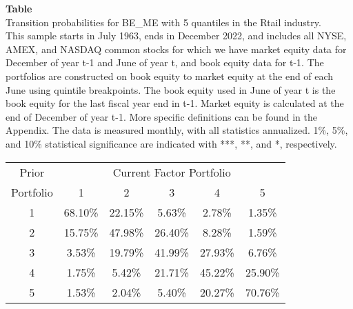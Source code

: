 \begin{table*}[ht!]
\raggedright
{}
\label{tab: transition_probs_BE_ME_Rtail_with_5_quantiles}
\textbf{Table \thetable} \\
Transition probabilities for BE_ME with 5 quantiles in the Rtail industry. \\
\hspace*{1em}This sample starts in July 1963, ends in December 2022, and includes all NYSE, AMEX, and NASDAQ common stocks for which we have market equity data for December of year t-1 and June of year t, and book equity data for t-1. The portfolios are constructed on book equity to market equity at the end of each June using quintile breakpoints.  The book equity used in June of year t is the book equity for the last fiscal year end in t-1.  Market equity is calculated at the end of December of year t-1.  More specific definitions can be found in the Appendix.  The data is measured monthly, with all statistics annualized.  1\%, 5\%, and 10\% statistical significance are indicated with ***, **, and *, respectively. \\
\vspace{0.5em}
\centering
\begin{adjustbox}{max width=\textwidth}
\begin{tabular}{@{}cccccc@{}}
\toprule
Prior & \multicolumn{5}{c}{Current Factor Portfolio} \\
Portfolio & 1 & 2 & 3 & 4 & 5 \\
\midrule
1 & 68.10\% & 22.15\% & 5.63\% & 2.78\% & 1.35\% \\
2 & 15.75\% & 47.98\% & 26.40\% & 8.28\% & 1.59\% \\
3 & 3.53\% & 19.79\% & 41.99\% & 27.93\% & 6.76\% \\
4 & 1.75\% & 5.42\% & 21.71\% & 45.22\% & 25.90\% \\
5 & 1.53\% & 2.04\% & 5.40\% & 20.27\% & 70.76\% \\
\bottomrule
\end{tabular}
\end{adjustbox}
\end{table*}